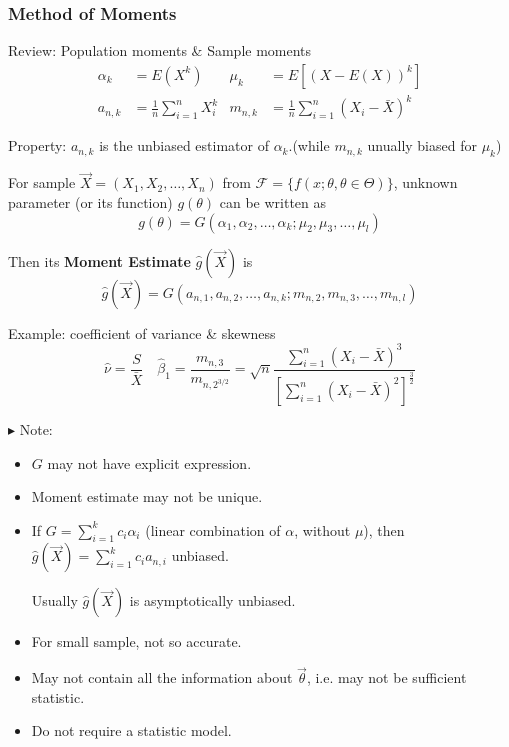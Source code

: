 \documentclass[11pt,a4paper]{ctexart}
\numberwithin{equation}{section}%
\newenvironment{point}{\raggedright$\blacktriangleright$}{}%
\begin{document}
\subsubsection{Method of Moments}\label{SubSectionMoM}
    Review: Population moments \& Sample moments
    \begin{align*}
        \alpha_k&=E(X^k)&\mu_k&=E[(X-E(X))^k]\\
        a_{n,k}&=\frac{1}{n}\sum_{i=1}^nX_i^k&m_{n,k}&=\frac{1}{n}\sum_{i=1}^n(X_i-\bar{X})^k
    \end{align*}

    Property: $a_{n,k}$ is the unbiased estimator of $\alpha_k$.(while $m_{n,k}$ unually biased for $\mu_k$)

    For sample $\vec{X}=(X_1,X_2,\ldots,X_n)$ from $\mathscr{F}=\{f(x;\theta,\theta\in\Theta)\}$, unknown parameter (or its function) $g(\theta)$ can be written as
    \[
        g(\theta)=G(\alpha_1,\alpha_2,\ldots,\alpha_k;\mu_2,\mu_3,\ldots,\mu_l)    
    \]

    Then its \textbf{Moment Estimate} $\hat{g}(\vec{X})$ is
\[
    \hat{g}(\vec{X})=G(a_{n,1},a_{n,2},\ldots,a_{n,k};m_{n,2},m_{n,3},\ldots,m_{n,l}) 
\]

    Example: coefficient of variance \& skewness 
    \[\hat{\nu}=\dfrac{S}{\bar{X}}\quad\hat{\beta}_1=\dfrac{m_{n,3}}{m_{n,2^{3/2}}}=\sqrt{n}{\displaystyle\frac{\displaystyle{\sum_{i=1}^n(X_i-\bar{X})^3}}{\displaystyle{[\sum_{i=1}^n(X_i-\bar{X})^2]^{\frac{3}{2}}}  }}\]

    \begin{point}
        Note:
    \end{point}
    
        
    \begin{itemize}
        \item $G$ may not have explicit expression.
        \item Moment estimate may not be unique.
        \item If $G={\displaystyle\sum_{i=1}^kc_i\alpha_i}$ (linear combination of $\alpha$, without $\mu$), then $\hat{g}(\vec{X})={\displaystyle\sum_{i=1}^kc_ia_{n,i}}$ unbiased.
        
        \qquad Usually $\hat{g}(\vec{X})$ is asymptotically unbiased.
        \item For small sample, not so accurate.
        \item May not contain all the information about $\vec{\theta}$, i.e. may not be sufficient statistic.
        \item Do not require a statistic model.
    \end{itemize}
\end{document}
